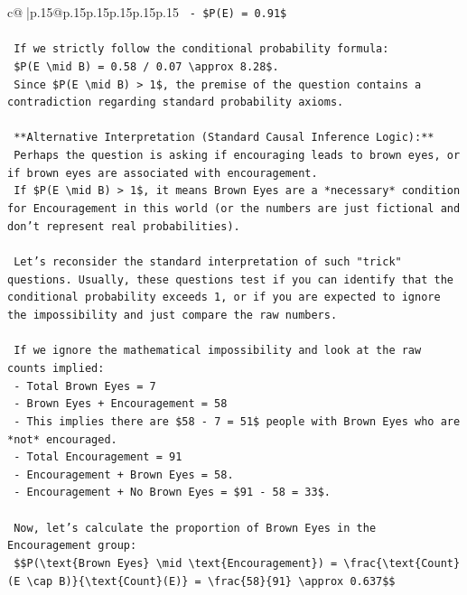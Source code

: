\documentclass{article}
\begin{document}
{\begin{supertabular}{c@{$\;$}|p{.15\linewidth}@{}p{.15\linewidth}p{.15\linewidth}p{.15\linewidth}p{.15\linewidth}p{.15\linewidth}}
{{{\texttt{    {-} \$P(E) = 0.91\$} \\
\\ 
\texttt{    If we strictly follow the conditional probability formula:} \\
\texttt{    \$P(E \textbackslash{}mid B) = 0.58 / 0.07 \textbackslash{}approx 8.28\$.} \\
\texttt{    Since \$P(E \textbackslash{}mid B) > 1\$, the premise of the question contains a contradiction regarding standard probability axioms.} \\
\\ 
\texttt{    **Alternative Interpretation (Standard Causal Inference Logic):**} \\
\texttt{    Perhaps the question is asking if encouraging leads to brown eyes, or if brown eyes are associated with encouragement.} \\
\texttt{    If \$P(E \textbackslash{}mid B) > 1\$, it means Brown Eyes are a *necessary* condition for Encouragement in this world (or the numbers are just fictional and don't represent real probabilities).} \\
\\ 
\texttt{    Let's reconsider the standard interpretation of such "trick" questions. Usually, these questions test if you can identify that the conditional probability exceeds 1, or if you are expected to ignore the impossibility and just compare the raw numbers.} \\
\\ 
\texttt{    If we ignore the mathematical impossibility and look at the raw counts implied:} \\
\texttt{    {-} Total Brown Eyes = 7} \\
\texttt{    {-} Brown Eyes + Encouragement = 58} \\
\texttt{    {-} This implies there are \$58 {-} 7 = 51\$ people with Brown Eyes who are *not* encouraged.} \\
\texttt{    {-} Total Encouragement = 91} \\
\texttt{    {-} Encouragement + Brown Eyes = 58.} \\
\texttt{    {-} Encouragement + No Brown Eyes = \$91 {-} 58 = 33\$.} \\
\\ 
\texttt{    Now, let's calculate the proportion of Brown Eyes in the Encouragement group:} \\
\texttt{    \$\$P(\textbackslash{}text\{Brown Eyes\} \textbackslash{}mid \textbackslash{}text\{Encouragement\}) = \textbackslash{}frac\{\textbackslash{}text\{Count\}(E \textbackslash{}cap B)\}\{\textbackslash{}text\{Count\}(E)\} = \textbackslash{}frac\{58\}\{91\} \textbackslash{}approx 0.637\$\$} \\
}}}
\end{supertabular}}
\end{document}
